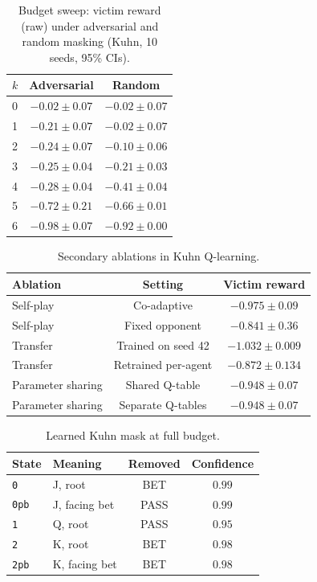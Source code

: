 \documentclass{article}
\begin{document}
\begin{table}[ht]
\centering
\caption{Budget sweep: victim reward (raw) under adversarial and random masking (Kuhn, 10 seeds, 95\% CIs).}
\label{tab:budget}
\begin{tabular}{lcc}
\toprule
$k$ & Adversarial & Random \\
\midrule
0 & $-0.02 \pm 0.07$ & $-0.02 \pm 0.07$ \\
1 & $-0.21 \pm 0.07$ & $-0.02 \pm 0.07$ \\
2 & $-0.24 \pm 0.07$ & $-0.10 \pm 0.06$ \\
3 & $-0.25 \pm 0.04$ & $-0.21 \pm 0.03$ \\
4 & $-0.28 \pm 0.04$ & $-0.41 \pm 0.04$ \\
5 & $-0.72 \pm 0.21$ & $-0.66 \pm 0.01$ \\
6 & $-0.98 \pm 0.07$ & $-0.92 \pm 0.00$ \\
\bottomrule
\end{tabular}
\end{table}

\begin{table}[ht]
\centering
\caption{Secondary ablations in Kuhn Q-learning.}
\begin{tabular}{lcc}
\toprule
Ablation & Setting & Victim reward \\
\midrule
Self-play & Co-adaptive & $-0.975 \pm 0.09$ \\
Self-play & Fixed opponent & $-0.841 \pm 0.36$ \\
Transfer & Trained on seed 42 & $-1.032 \pm 0.009$ \\
Transfer & Retrained per-agent & $-0.872 \pm 0.134$ \\
Parameter sharing & Shared Q-table & $-0.948 \pm 0.07$ \\
Parameter sharing & Separate Q-tables & $-0.948 \pm 0.07$ \\
\bottomrule
\end{tabular}
\end{table}

\begin{table}[ht]
\centering
\caption{Learned Kuhn mask at full budget.}
\begin{tabular}{llcc}
\toprule
State & Meaning & Removed & Confidence \\
\midrule
\texttt{0} & J, root & BET & $0.99$ \\
\texttt{0pb} & J, facing bet & PASS & $0.99$ \\
\texttt{1} & Q, root & PASS & $0.95$ \\
\texttt{2} & K, root & BET & $0.98$ \\
\texttt{2pb} & K, facing bet & BET & $0.98$ \\
\bottomrule
\end{tabular}
\end{table}
\end{document}
